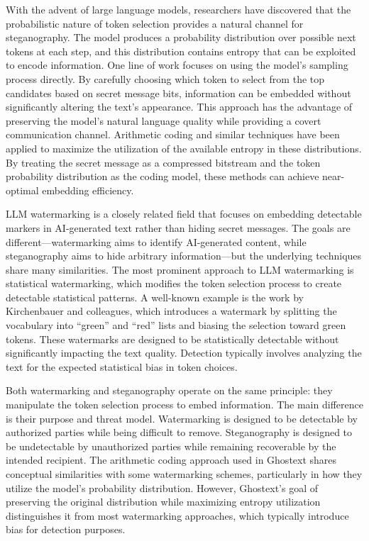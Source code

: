 \documentclass[sigconf,review,anonymous]{acmart}
\begin{document}
With the advent of large language models, researchers have discovered that the probabilistic nature of token selection provides a natural channel for steganography. The model produces a probability distribution over possible next tokens at each step, and this distribution contains entropy that can be exploited to encode information. One line of work focuses on using the model's sampling process directly. By carefully choosing which token to select from the top candidates based on secret message bits, information can be embedded without significantly altering the text's appearance. This approach has the advantage of preserving the model's natural language quality while providing a covert communication channel. Arithmetic coding and similar techniques have been applied to maximize the utilization of the available entropy in these distributions. By treating the secret message as a compressed bitstream and the token probability distribution as the coding model, these methods can achieve near-optimal embedding efficiency.

LLM watermarking is a closely related field that focuses on embedding detectable markers in AI-generated text rather than hiding secret messages. The goals are different---watermarking aims to identify AI-generated content, while steganography aims to hide arbitrary information---but the underlying techniques share many similarities. The most prominent approach to LLM watermarking is statistical watermarking, which modifies the token selection process to create detectable statistical patterns. A well-known example is the work by Kirchenbauer and colleagues, which introduces a watermark by splitting the vocabulary into ``green'' and ``red'' lists and biasing the selection toward green tokens. These watermarks are designed to be statistically detectable without significantly impacting the text quality. Detection typically involves analyzing the text for the expected statistical bias in token choices.

Both watermarking and steganography operate on the same principle: they manipulate the token selection process to embed information. The main difference is their purpose and threat model. Watermarking is designed to be detectable by authorized parties while being difficult to remove. Steganography is designed to be undetectable by unauthorized parties while remaining recoverable by the intended recipient. The arithmetic coding approach used in Ghostext shares conceptual similarities with some watermarking schemes, particularly in how they utilize the model's probability distribution. However, Ghostext's goal of preserving the original distribution while maximizing entropy utilization distinguishes it from most watermarking approaches, which typically introduce bias for detection purposes.
\end{document}
